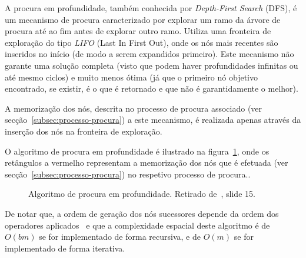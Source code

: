 A procura em profundidade, também conhecida por \textit{Depth-First Search} (DFS), é um mecanismo de procura caracterizado por explorar um ramo da árvore de procura até ao fim antes de explorar outro ramo.
Utiliza uma fronteira de exploração do tipo \textit{LIFO} (Last In First Out), onde os nós mais recentes são inseridos no início (de modo a serem expandidos primeiro).
Este mecanismo não garante uma solução completa (visto que podem haver profundidades infinitas ou até mesmo ciclos) e muito menos ótima (já que o primeiro nó objetivo encontrado, se existir, é o que é retornado e que não é garantidamente o melhor).

A memorização dos nós, descrita no processo de procura associado (ver secção~\ref{subsec:processo-procura}) a este mecanismo, é realizada apenas através da inserção dos nós na fronteira de exploração.

O algoritmo de procura em profundidade é ilustrado na figura~\ref{fig:alg-proc-profundidade}, onde os retângulos a vermelho representam a memorização dos nós que é efetuada (ver secção~\ref{subsec:processo-procura}) no respetivo processo de procura..

\begin{figure}[H]
    \begin{center}
    \end{center}
    \caption{Algoritmo de procura em profundidade. Retirado de~\cite{isel:iasa:slides:proc-espaco-estados-parte-1}, slide 15.}
    \label{fig:alg-proc-profundidade}
\end{figure}

De notar que, a ordem de geração dos nós sucessores depende da ordem dos operadores aplicados~\cite{isel:iasa:slides:proc-espaco-estados-parte-1} e que a complexidade espacial deste algoritmo é de $O(bm)$ se for implementado de forma recursiva, e de $O(m)$ se for implementado de forma iterativa.

